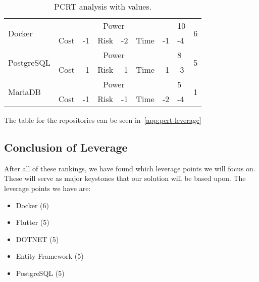 \begin{table}[h]
{\begin{tabular}{|l|l|l|l|l|l|l|l|c|l|}
    \multirow{2}{*}{Docker} & \multicolumn{6}{c|}{Power} & 10 & \multicolumn{2}{c|}{\multirow{2}{*}{6}} \\ \cline{2-8}
     & Cost & -1 & Risk & -2 & Time & -1 & -4 & \multicolumn{2}{c|}{} \\ \hline
    \multirow{2}{*}{PostgreSQL} & \multicolumn{6}{c|}{Power} & 8 & \multicolumn{2}{c|}{\multirow{2}{*}{5}} \\ \cline{2-8}
     & Cost & -1 & Risk & -1 & Time & -1 & -3 & \multicolumn{2}{c|}{} \\ \hline
    \multirow{2}{*}{MariaDB} & \multicolumn{6}{c|}{Power} & 5 & \multicolumn{2}{c|}{\multirow{2}{*}{1}} \\ \cline{2-8}
     & Cost & -1 & Risk & -1 & Time & -2 & -4 & \multicolumn{2}{c|}{} \\ \hline
    \end{tabular}
    }
    \caption{PCRT analysis with values.}
    \label{tab:pcrt-technologies-leverage}
\end{table}

The table for the repositories can be seen in~\autoref{app:pcrt-leverage}

\subsection{Conclusion of Leverage}
After all of these rankings, we have found which leverage points we will focus on.
These will serve as major keystones that our solution will be based upon.
The leverage points we have are: 

\begin{itemize}
    \item Docker (6)
    \item Flutter (5)
    \item DOTNET (5)
    \item Entity Framework (5)
    \item PostgreSQL (5)
\end{itemize}
